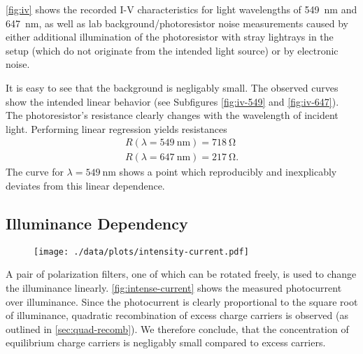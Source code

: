 \autoref{fig:iv} shows the recorded I-V characteristics for light wavelengths of \SI{549}{\nm} and \SI{647}{\nm}, as well as lab background/photoresistor noise measurements caused by either additional illumination of the photoresistor with stray lightrays in the setup (which do not originate from the intended light source) or by electronic noise.

It is easy to see that the background is negligably small.
The observed curves show the intended linear behavior (see Subfigures \ref{fig:iv-549} and \ref{fig:iv-647}).
The photoresistor's resistance clearly changes with the wavelength of incident light.
Performing linear regression yields resistances
\begin{align*}
  R(\lambda = \SI{549}{\nm}) = \SI{718}{\ohm} \\
  R(\lambda = \SI{647}{\nm}) = \SI{217}{\ohm}.
\end{align*}
The curve for $\lambda=\SI{549}{\nm}$ shows a point which reproducibly and inexplicably deviates from this linear dependence.

\subsection{Illuminance Dependency}
\begin{figure}
	\centering
	\texttt{[image: ./data/plots/intensity-current.pdf]}
	\label{fig:intense-current}
\end{figure}
A pair of polarization filters, one of which can be rotated freely, is used to change the illuminance linearly.
\autoref{fig:intense-current} shows the measured photocurrent over illuminance.
Since the photocurrent is clearly proportional to the square root of illuminance, quadratic recombination of excess charge carriers is observed (as outlined in \autoref{sec:quad-recomb}).
We therefore conclude, that the concentration of equilibrium charge carriers is negligably small compared to excess carriers.

